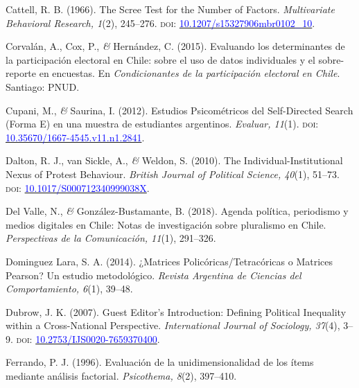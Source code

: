 \documentclass[a4paper]{tufte-handout}
\begin{document}
\begin{list}{}
\item{\small Cattell, R. B. (1966). The Scree Test for the Number of Factors. {\itshape Multivariate Behavioral Research, 1}(2), 245--276. {\scshape doi:} \href{https://doi.org/10.1207/s15327906mbr0102_10}{\textcolor{blue}{10.1207/s15327906mbr0102\_10}}.}

\item{\small Corvalán, A., Cox, P., {\itshape \&} Hernández, C. (2015). Evaluando los determinantes de la participación electoral en Chile: sobre el uso de datos individuales y el sobre-reporte en encuestas. En {\itshape Condicionantes de la participación electoral en Chile}. Santiago: PNUD.}

\item{\small Cupani, M., {\itshape \&} Saurina, I. (2012). Estudios Psicométricos del Self-Directed Search (Forma E) en una muestra de estudiantes argentinos. {\itshape Evaluar, 11}(1). {\scshape doi:} \href{https://doi.org/10.35670/1667-4545.v11.n1.2841}{\textcolor{blue}{10.35670/1667-4545.v11.n1.2841}}.}

\item{\small Dalton, R. J., van Sickle, A., {\itshape \&} Weldon, S. (2010). The Individual-Institutional Nexus of Protest Behaviour. {\itshape British Journal of Political Science, 40}(1), 51--73. {\scshape doi:} \href{https://doi.org/10.1017/S000712340999038X}{\textcolor{blue}{10.1017/S000712340999038X}}.}

\item{\small Del Valle, N., {\itshape \&} González-Bustamante, B. (2018). Agenda política, periodismo y medios digitales en Chile: Notas de investigación sobre pluralismo en Chile. {\itshape Perspectivas de la Comunicación, 11}(1), 291--326.}

\item{\small Dominguez Lara, S. A. (2014). ¿Matrices Policóricas/Tetracóricas o Matrices Pearson? Un estudio metodológico. {\itshape Revista Argentina de Ciencias del Comportamiento, 6}(1), 39--48.}

\item{\small Dubrow, J. K. (2007). Guest Editor’s Introduction: Defining Political Inequality within a Cross-National Perspective. {\itshape International Journal of Sociology, 37}(4), 3--9. {\scshape doi:} \href{https://doi.org/10.2753/IJS0020-7659370400}{\textcolor{blue}{10.2753/IJS0020-7659370400}}.}

\item{\small Ferrando, P. J. (1996). Evaluación de la unidimensionalidad de los ítems mediante análisis factorial. {\itshape Psicothema, 8}(2), 397--410.}


\end{list}
\end{document}
